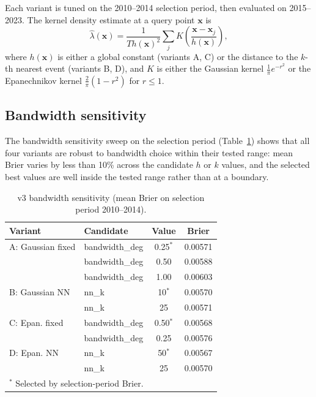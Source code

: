 \documentclass[10pt,a4paper,twocolumn]{article}
\begin{document}
Each variant is tuned on the 2010--2014 selection period, then evaluated on 2015--2023. The kernel density estimate at a query point $\mathbf{x}$ is
\[
\hat\lambda(\mathbf{x}) = \frac{1}{T h(\mathbf{x})^2} \sum_j K\!\left(\frac{\mathbf{x} - \mathbf{x}_j}{h(\mathbf{x})}\right),
\]
where $h(\mathbf{x})$ is either a global constant (variants A, C) or the distance to the $k$-th nearest event (variants B, D), and $K$ is either the Gaussian kernel $\frac{1}{\pi}e^{-r^2}$ or the Epanechnikov kernel $\frac{2}{\pi}(1-r^2)$ for $r\leq1$.

\subsection{Bandwidth sensitivity}

The bandwidth sensitivity sweep on the selection period (Table~\ref{tab:v3-bandwidth}) shows that all four variants are robust to bandwidth choice within their tested range: mean Brier varies by less than 10\% across the candidate $h$ or $k$ values, and the selected best values are well inside the tested range rather than at a boundary.

\begin{table}[t]
\centering
\caption{v3 bandwidth sensitivity (mean Brier on selection period 2010--2014).}\label{tab:v3-bandwidth}
\small
\begin{tabular*}{\columnwidth}{@{\extracolsep{\fill}}llcc}
\toprule
Variant & Candidate & Value & Brier \\
\midrule
A: Gaussian fixed & bandwidth\_deg & 0.25$^\ast$ & 0.00571 \\
                 & bandwidth\_deg & 0.50 & 0.00588 \\
                 & bandwidth\_deg & 1.00 & 0.00603 \\
B: Gaussian NN    & nn\_k & 10$^\ast$ & 0.00570 \\
                 & nn\_k & 25 & 0.00571 \\
C: Epan. fixed    & bandwidth\_deg & 0.50$^\ast$ & 0.00568 \\
                 & bandwidth\_deg & 0.25 & 0.00576 \\
D: Epan. NN       & nn\_k & 50$^\ast$ & 0.00567 \\
                 & nn\_k & 25 & 0.00570 \\
\bottomrule
\multicolumn{4}{l}{\footnotesize $^\ast$ Selected by selection-period Brier.}
\end{tabular*}
\end{table}
\end{document}
